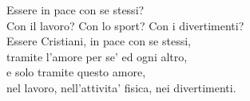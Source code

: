 
\begin{haiku}
    Essere in pace con se stessi?\\
    Con il lavoro? Con lo sport? Con i divertimenti?\\
    Essere Cristiani, in pace con se stessi,\\
    tramite l'amore per se' ed ogni altro,\\
    e solo tramite questo amore,\\
    nel lavoro, nell'attivita' fisica, nei divertimenti.\\
\end{haiku}

